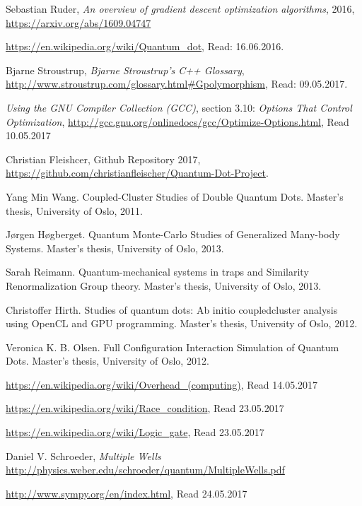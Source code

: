 \documentclass[../main.tex]{subfiles}
\begin{document}
\begin{thebibliography}{99}
 Sebastian Ruder, \emph{An overview of gradient descent optimization
algorithms}, 2016, \url{https://arxiv.org/abs/1609.04747}

 \url{https://en.wikipedia.org/wiki/Quantum_dot}, Read: 16.06.2016.

 Bjarne Stroustrup, \emph{Bjarne Stroustrup's C++ Glossary},  \url{http://www.stroustrup.com/glossary.html#Gpolymorphism}, Read: 09.05.2017.

 \emph{Using the GNU Compiler Collection (GCC)}, section 3.10: \emph{Options That Control Optimization}, \url{http://gcc.gnu.org/onlinedocs/gcc/Optimize-Options.html}, Read 10.05.2017

 Christian Fleishcer, Github Repository 2017,  \url{https://github.com/christianfleischer/Quantum-Dot-Project}.

 Yang Min Wang. Coupled-Cluster Studies of Double Quantum
Dots. Master’s thesis, University of Oslo, 2011.

 Jørgen Høgberget. Quantum Monte-Carlo Studies of Generalized Many-body Systems. 
Master’s thesis, University of Oslo, 2013.

 Sarah Reimann. Quantum-mechanical systems in traps and Similarity Renormalization Group theory. Master’s thesis, University of Oslo, 2013.

 Christoffer Hirth. Studies of quantum dots: Ab initio coupledcluster analysis using OpenCL and GPU programming. Master’s thesis, University of Oslo, 2012.

 Veronica K. B. Olsen. Full Configuration Interaction Simulation of Quantum Dots. Master’s thesis, University of Oslo, 2012.

 \url{https://en.wikipedia.org/wiki/Overhead_(computing)}, Read 14.05.2017

 \url{https://en.wikipedia.org/wiki/Race_condition}, Read 23.05.2017

 \url{https://en.wikipedia.org/wiki/Logic_gate}, Read 23.05.2017

 Daniel V. Schroeder, \emph{Multiple Wells} \url{http://physics.weber.edu/schroeder/quantum/MultipleWells.pdf}

 \url{http://www.sympy.org/en/index.html}, Read 24.05.2017

\end{thebibliography}
\end{document}
